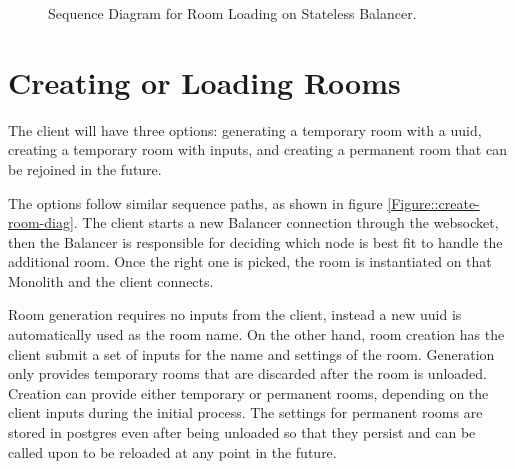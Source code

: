 \begin{figure}[!htb]
  \centering
  \caption{\label{Figure::join-room-stateless} Sequence Diagram for Room Loading on Stateless Balancer.}
\end{figure}

\section{Creating or Loading Rooms}

The client will have three options: generating a temporary room with a uuid, creating a temporary room with inputs, and creating a permanent room that can be rejoined in the future.

The options follow similar sequence paths, as shown in figure \ref{Figure::create-room-diag}. The client starts a new Balancer connection through the websocket, then the Balancer is responsible for deciding which node is best fit to handle the additional room. Once the right one is picked, the room is instantiated on that Monolith and the client connects.

Room generation requires no inputs from the client, instead a new uuid is automatically used as the room name. On the other hand, room creation has the client submit a set of inputs for the name and settings of the room. Generation only provides temporary rooms that are discarded after the room is unloaded. Creation can provide either temporary or permanent rooms, depending on the client inputs during the initial process. The settings for permanent rooms are stored in postgres even after being unloaded so that they persist and can be called upon to be reloaded at any point in the future.

